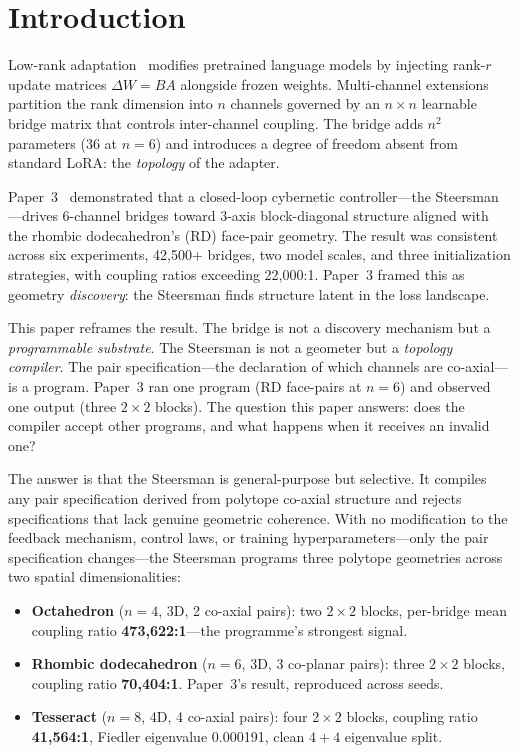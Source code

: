 \section{Introduction}
\label{sec:intro}

Low-rank adaptation~\cite{hu2022lora} modifies pretrained language models
by injecting rank-$r$ update matrices $\Delta W = BA$ alongside frozen
weights. Multi-channel extensions~\cite{bielec2026weights,bielec2026bridge}
partition the rank dimension into $n$ channels governed by an
$n \times n$ learnable bridge matrix that controls inter-channel coupling.
The bridge adds $n^2$ parameters (36 at $n{=}6$) and introduces a degree
of freedom absent from standard LoRA: the \emph{topology} of the adapter.

Paper~3~\cite{bielec2026bridge} demonstrated that a closed-loop cybernetic
controller---the Steersman---drives 6-channel bridges toward 3-axis
block-diagonal structure aligned with the rhombic dodecahedron's (RD)
face-pair geometry. The result was consistent across six experiments,
42{,}500+ bridges, two model scales, and three initialization strategies,
with coupling ratios exceeding 22{,}000:1. Paper~3 framed this as
geometry \emph{discovery}: the Steersman finds structure latent in the
loss landscape.

This paper reframes the result. The bridge is not a discovery mechanism
but a \emph{programmable substrate}. The Steersman is not a geometer but
a \emph{topology compiler}. The pair specification---the declaration of
which channels are co-axial---is a program. Paper~3 ran one program (RD
face-pairs at $n{=}6$) and observed one output (three $2 \times 2$
blocks). The question this paper answers: does the compiler accept other
programs, and what happens when it receives an invalid one?

The answer is that the Steersman is general-purpose but selective. It
compiles any pair specification derived from polytope co-axial structure
and rejects specifications that lack genuine geometric coherence. With no
modification to the feedback mechanism, control laws, or training
hyperparameters---only the pair specification changes---the Steersman
programs three polytope geometries across two spatial dimensionalities:

\begin{itemize}
  \item \textbf{Octahedron} ($n{=}4$, 3D, 2 co-axial pairs):
    two $2 \times 2$ blocks, per-bridge mean coupling ratio
    \textbf{473{,}622:1}---the programme's strongest signal.
  \item \textbf{Rhombic dodecahedron} ($n{=}6$, 3D, 3 co-planar pairs):
    three $2 \times 2$ blocks, coupling ratio \textbf{70{,}404:1}.
    Paper~3's result, reproduced across seeds.
  \item \textbf{Tesseract} ($n{=}8$, 4D, 4 co-axial pairs):
    four $2 \times 2$ blocks, coupling ratio \textbf{41{,}564:1},
    Fiedler eigenvalue 0.000191, clean $4{+}4$ eigenvalue split.
\end{itemize}

